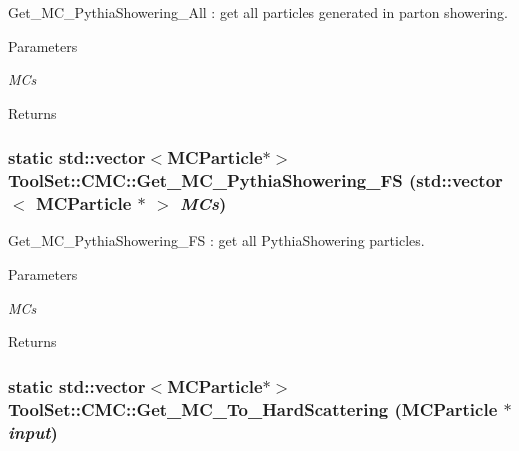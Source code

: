 Get\_\-MC\_\-PythiaShowering\_\-All : get all particles generated in parton showering. 
\begin{DoxyParams}{Parameters}
\item[{\em MCs}]\end{DoxyParams}
\begin{DoxyReturn}{Returns}

\end{DoxyReturn}
\hypertarget{classToolSet_1_1CMC_a321f55fa02ad6ed18931bc906b2e19ee}{
\subsubsection[{Get\_\-MC\_\-PythiaShowering\_\-FS}]{\setlength{\rightskip}{0pt plus 5cm}static std::vector$<$MCParticle$\ast$$>$ ToolSet::CMC::Get\_\-MC\_\-PythiaShowering\_\-FS (std::vector$<$ MCParticle $\ast$ $>$ {\em MCs})}}
\label{classToolSet_1_1CMC_a321f55fa02ad6ed18931bc906b2e19ee}


Get\_\-MC\_\-PythiaShowering\_\-FS : get all PythiaShowering particles. 
\begin{DoxyParams}{Parameters}
\item[{\em MCs}]\end{DoxyParams}
\begin{DoxyReturn}{Returns}

\end{DoxyReturn}
\hypertarget{classToolSet_1_1CMC_a756210f61bb929e423d1372989ad0358}{
\subsubsection[{Get\_\-MC\_\-To\_\-HardScattering}]{\setlength{\rightskip}{0pt plus 5cm}static std::vector$<$MCParticle$\ast$$>$ ToolSet::CMC::Get\_\-MC\_\-To\_\-HardScattering (MCParticle $\ast$ {\em input})}}
\label{classToolSet_1_1CMC_a756210f61bb929e423d1372989ad0358}


